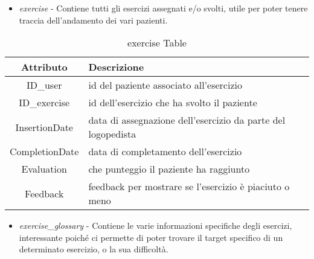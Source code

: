 \documentclass{article}
\begin{document}
\begin{itemize}
\item    \textit{exercise} - Contiene tutti gli esercizi assegnati e/o svolti, utile per poter tenere traccia dell'andamento dei vari pazienti.
\end{itemize}

    \begin{table}[h]
        \centering
        \caption{exercise Table}
        \begin{tabular}{|c|p{8cm}|}
            \hline
                \textbf{Attributo} & \textbf{Descrizione} \\
            \hline
                ID\_user & id del paziente associato all'esercizio\\
            \hline
                ID\_exercise & id dell'esercizio che ha svolto il paziente\\
            \hline
                InsertionDate & data di assegnazione dell'esercizio da parte del logopedista\\
            \hline
                CompletionDate & data di completamento dell'esercizio\\
            \hline
                Evaluation & che punteggio il paziente ha raggiunto\\
            \hline
                Feedback & feedback per mostrare se l'esercizio è piaciuto o meno\\
            \hline
        \end{tabular}
    \end{table}

\pagebreak

\begin{itemize}
\item     \textit{exercise\_glossary} - Contiene le varie informazioni specifiche degli esercizi, interessante poiché ci permette di poter trovare il target specifico di un determinato esercizio, o la sua difficoltà.
\end{itemize}
\end{document}

